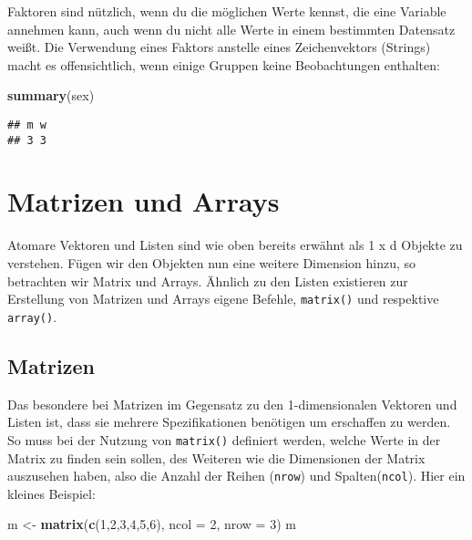 \documentclass[
]{book}
\newenvironment{Shaded}{\begin{snugshade}}{\end{snugshade}}
\newcommand{\DataTypeTok}[1]{\textcolor[rgb]{0.13,0.29,0.53}{#1}}
\newcommand{\DecValTok}[1]{\textcolor[rgb]{0.00,0.00,0.81}{#1}}
\newcommand{\KeywordTok}[1]{\textcolor[rgb]{0.13,0.29,0.53}{\textbf{#1}}}
\newcommand{\NormalTok}[1]{#1}
\newcommand{\StringTok}[1]{\textcolor[rgb]{0.31,0.60,0.02}{#1}}
\begin{document}
Faktoren sind nützlich, wenn du die möglichen Werte kennst, die eine Variable annehmen kann, auch wenn
du nicht alle Werte in einem bestimmten Datensatz weißt.
Die Verwendung eines Faktors anstelle eines Zeichenvektors (Strings) macht es offensichtlich, wenn einige Gruppen keine Beobachtungen enthalten:

\begin{Shaded}
\begin{Highlighting}[]
\KeywordTok{summary}\NormalTok{(sex)}
\end{Highlighting}
\end{Shaded}

\begin{verbatim}
## m w 
## 3 3
\end{verbatim}

\hypertarget{matrizen-und-arrays}{%
\section{Matrizen und Arrays}\label{matrizen-und-arrays}}

Atomare Vektoren und Listen sind wie oben bereits erwähnt als 1 x d Objekte zu verstehen.
Fügen wir den Objekten nun eine weitere Dimension hinzu, so betrachten wir Matrix und Arrays.
Ähnlich zu den Listen existieren zur Erstellung von Matrizen und Arrays eigene Befehle, \texttt{matrix()} und respektive \texttt{array()}.

\hypertarget{matrizen}{%
\subsection{Matrizen}\label{matrizen}}

Das besondere bei Matrizen im Gegensatz zu den 1-dimensionalen Vektoren und Listen ist, dass sie mehrere Spezifikationen benötigen um erschaffen zu werden.
So muss bei der Nutzung von \texttt{matrix()} definiert werden, welche Werte in der Matrix zu finden sein sollen, des Weiteren wie die Dimensionen der Matrix auszusehen haben, also die Anzahl der Reihen (\texttt{nrow}) und Spalten(\texttt{ncol}).
Hier ein kleines Beispiel:

\begin{Shaded}
\begin{Highlighting}[]
\NormalTok{m <-}\StringTok{ }\KeywordTok{matrix}\NormalTok{(}\KeywordTok{c}\NormalTok{(}\DecValTok{1}\NormalTok{,}\DecValTok{2}\NormalTok{,}\DecValTok{3}\NormalTok{,}\DecValTok{4}\NormalTok{,}\DecValTok{5}\NormalTok{,}\DecValTok{6}\NormalTok{), }\DataTypeTok{ncol =} \DecValTok{2}\NormalTok{, }\DataTypeTok{nrow =} \DecValTok{3}\NormalTok{)}
\NormalTok{m}
\end{Highlighting}
\end{Shaded}
\end{document}

